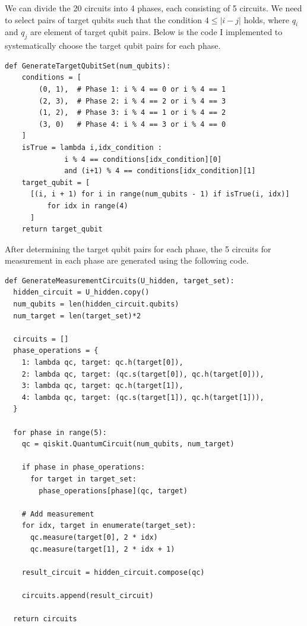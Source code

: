 \documentclass[a4paper, 11pt]{article}
\begin{document}
We can divide the 20 circuits into 4 phases, each consisting of 5 circuits. 
We need to select pairs of target qubits such that the condition $4 \leq |i-j|$ holds, where $q_i$ and $q_j$ are element of target qubit pairs. 
Below is the code I implemented to systematically choose the target qubit pairs for each phase.
\begin{verbatim}
def GenerateTargetQubitSet(num_qubits):
    conditions = [
        (0, 1),  # Phase 1: i % 4 == 0 or i % 4 == 1
        (2, 3),  # Phase 2: i % 4 == 2 or i % 4 == 3
        (1, 2),  # Phase 3: i % 4 == 1 or i % 4 == 2
        (3, 0)   # Phase 4: i % 4 == 3 or i % 4 == 0
    ]
    isTrue = lambda i,idx_condition : 
              i % 4 == conditions[idx_condition][0] 
              and (i+1) % 4 == conditions[idx_condition][1]
    target_qubit = [
      [(i, i + 1) for i in range(num_qubits - 1) if isTrue(i, idx)]
          for idx in range(4)
      ]
    return target_qubit
\end{verbatim}

After determining the target qubit pairs for each phase, the 5 circuits for measurement in each phase are generated using the following code.
\begin{verbatim}
def GenerateMeasurementCircuits(U_hidden, target_set):
  hidden_circuit = U_hidden.copy()
  num_qubits = len(hidden_circuit.qubits)
  num_target = len(target_set)*2
  
  circuits = []
  phase_operations = {
    1: lambda qc, target: qc.h(target[0]),
    2: lambda qc, target: (qc.s(target[0]), qc.h(target[0])),
    3: lambda qc, target: qc.h(target[1]),
    4: lambda qc, target: (qc.s(target[1]), qc.h(target[1])),
  }
  
  for phase in range(5):
    qc = qiskit.QuantumCircuit(num_qubits, num_target)
      
    if phase in phase_operations:
      for target in target_set:
        phase_operations[phase](qc, target)
    
    # Add measurement
    for idx, target in enumerate(target_set):
      qc.measure(target[0], 2 * idx)
      qc.measure(target[1], 2 * idx + 1)
      
    result_circuit = hidden_circuit.compose(qc)
    
    circuits.append(result_circuit)
      
  return circuits

\end{verbatim}
\end{document}
